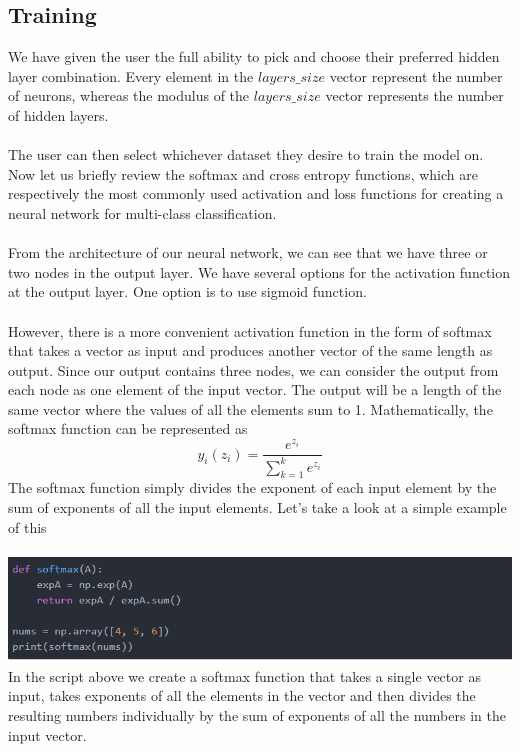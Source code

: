 \documentclass[11pt]{article}
\theoremstyle{definition}
\begin{document}
\subsection{Training}
We have given the user the full ability to pick and choose their preferred hidden layer combination. Every element in the $layers\_size$ vector represent the number of neurons, whereas the modulus of the $layers\_size$ vector represents the number of hidden layers.\\\\
The user can then select whichever dataset they desire to train the model on. Now let us briefly review the softmax and cross entropy functions, which are respectively the most commonly used activation and loss functions for creating a neural network for multi-class classification.\\\\
From the architecture of our neural network, we can see that we have three or two nodes in the output layer. We have several options for the activation function at the output layer. One option is to use sigmoid function.\\\\
However, there is a more convenient activation function in the form of softmax that takes a vector as input and produces another vector of the same length as output. Since our output contains three nodes, we can consider the output from each node as one element of the input vector. The output will be a length of the same vector where the values of all the elements sum to 1. Mathematically, the softmax function can be represented as
$$
y_i(z_i)=\frac{e^{z_i}}{\sum^k_{k=1}e^{z_i}}
$$ 
The softmax function simply divides the exponent of each input element by the sum of exponents of all the input elements. Let's take a look at a simple example of this\\\\
\includegraphics[scale=1]{image1.PNG}\\
In the script above we create a softmax function that takes a single vector as input, takes exponents of all the elements in the vector and then divides the resulting numbers individually by the sum of exponents of all the numbers in the input vector.\\\\
\end{document}
